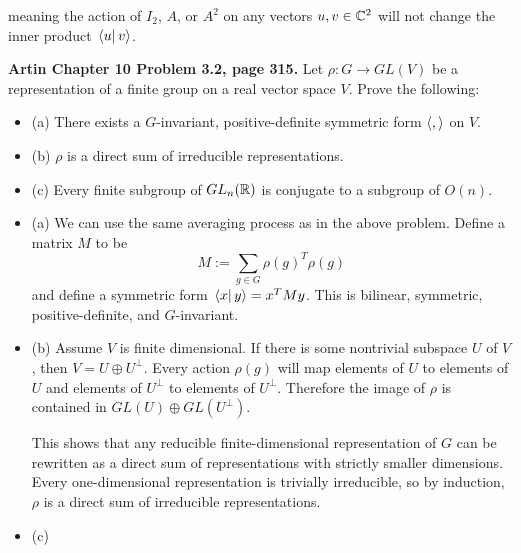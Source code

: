 \documentclass{article}
\begin{document}
meaning the action of $I_2$, $A$, or $A^2$ on any vectors $u, v \in \mathbb{C}^2$ will not change the inner product $ \left.\left\langle u\right\vert v \right\rangle $.
\bigskip
\begin{prob}
    \textbf{Artin Chapter 10 Problem 3.2, page 315.} Let $\rho: G \rightarrow GL(V)$ be a representation of a finite group on a real vector space $V$. Prove the following:
    \begin{itemize}
        \item (a) There exists a $G$-invariant, positive-definite symmetric form $\left\langle , \right\rangle$ on $V$.
        \item (b) $\rho$ is a direct sum of irreducible representations.
        \item (c) Every finite subgroup of $GL_n(\mathbb{R})$ is conjugate to a subgroup of $O(n)$.
    \end{itemize}
\end{prob}
\begin{itemize}
    \item (a) We can use the same averaging process as in the above problem. Define a matrix $M$ to be
        \[ M := \sum_{g \in G} \rho(g)^T \rho(g) \]
        and define a symmetric form $ \left.\left\langle x\right\vert y \right\rangle = x^TMy$. This is bilinear, symmetric, positive-definite, and $G$-invariant.
    \item (b) Assume $V$ is finite dimensional. If there is some nontrivial subspace $U$ of $V$, then $V = U \oplus U^\perp$. Every action $\rho(g)$ will map elements of $U$ to elements of $U$ and elements of $U^\perp$ to elements of $U^\perp$. Therefore the image of $\rho$ is contained in $GL(U) \oplus GL(U^\perp)$.
        \par
        This shows that any reducible finite-dimensional representation of $G$ can be rewritten as a direct sum of representations with strictly smaller dimensions. Every one-dimensional representation is trivially irreducible, so by induction, $\rho$ is a direct sum of irreducible representations.
    \item (c)
\end{itemize}
\end{document}
